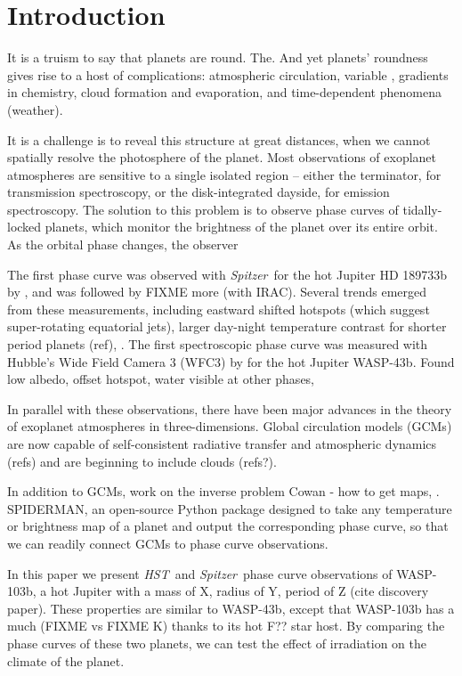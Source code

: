 \documentclass[twocolumn]{aastex61}
\newcommand{\project}[1]{\textsl{#1}}
\newcommand{\HST}{\project{HST}}
\newcommand{\Spitzer}{\project{Spitzer}}
\begin{document}
\section{Introduction} \label{sec:intro}
It is a truism to say that planets are round.  The. And yet planets' roundness gives rise to a host of complications:  atmospheric circulation, variable , gradients in chemistry, cloud formation and evaporation, and time-dependent phenomena (weather).

It is a challenge is to reveal this structure at great distances, when we cannot spatially resolve the photosphere of the planet.  Most observations of exoplanet atmospheres are sensitive to a single isolated region  -- either the terminator, for transmission spectroscopy, or the disk-integrated dayside, for emission spectroscopy.  The solution to this problem is to observe phase curves of tidally-locked planets, which monitor the brightness of the planet over its entire orbit. As the orbital phase changes, the observer 

The first phase curve was observed with \Spitzer\ for the hot Jupiter HD 189733b by \citep{knutson??}, and was followed by FIXME more (with IRAC). Several trends emerged from these measurements, including eastward shifted hotspots (which suggest super-rotating equatorial jets), larger day-night temperature contrast for shorter period planets (ref), . The first spectroscopic phase curve was measured with Hubble's Wide Field Camera 3 (WFC3) by \citep{stevenson???} for the hot Jupiter WASP-43b. Found low albedo, offset hotspot, water visible at other phases, 

In parallel with these observations, there have been major advances in the theory of exoplanet atmospheres in three-dimensions. Global circulation models (GCMs) are now capable of self-consistent radiative transfer and atmospheric dynamics (refs) and are beginning to include clouds (refs?). 

In addition to GCMs, work on the inverse problem Cowan - how to get maps, . SPIDERMAN, an open-source Python package designed to take any temperature or brightness map of a planet and output the corresponding phase curve, so that we can readily connect GCMs to phase curve observations.  


In this paper we present \HST\ and \Spitzer\ phase curve observations of WASP-103b, a hot Jupiter with a mass of X, radius of Y, period of Z (cite discovery paper). These properties are similar to WASP-43b, except that WASP-103b has a much (FIXME vs FIXME K) thanks to its hot F?? star host. By comparing the phase curves of these two planets, we can test the effect of irradiation on the climate of the planet.
\end{document}
